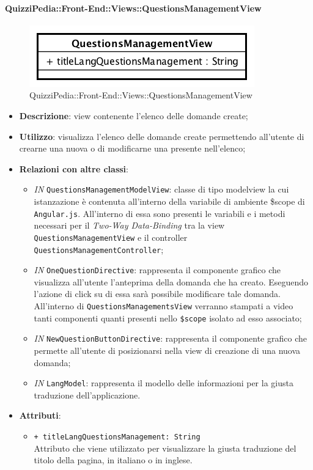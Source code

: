 \paragraph{QuizziPedia::Front-End::Views::QuestionsManagementView}
\begin{figure} [ht]
	\centering
	\includegraphics[scale=0.80]{UML/Classi/Front-End/QuizziPedia_Front-end_Views_QuestionsManagementView.png}
	\caption{QuizziPedia::Front-End::Views::QuestionsManagementView}
\end{figure} \FloatBarrier
\begin{itemize}
	\item \textbf{Descrizione}: view contenente l'elenco delle domande create; 
	\item \textbf{Utilizzo}: visualizza l'elenco delle domande create permettendo all'utente di crearne una nuova o di modificarne una presente nell'elenco;
	\item \textbf{Relazioni con altre classi}:
	\begin{itemize} 
		\item \textit{IN} \texttt{QuestionsManagementModelView}: classe di tipo modelview la cui istanzazione è contenuta all'interno della variabile di ambiente \$scope di \texttt{Angular.js}. All'interno di essa sono presenti le variabili e i metodi necessari per il \textit{Two-Way Data-Binding} tra la view \texttt{QuestionsManagementView} e il controller \texttt{QuestionsManagementController};
		\item \textit{IN} \texttt{OneQuestionDirective}: rappresenta il componente grafico che visualizza all'utente l'anteprima della domanda che ha creato. Eseguendo l'azione di click su di essa sarà possibile modificare tale domanda. All'interno di \texttt{QuestionsManagementsView} verranno stampati a video tanti componenti quanti presenti nello \texttt{\$scope} isolato ad esso associato;
		\item \textit{IN} \texttt{NewQuestionButtonDirective}:  rappresenta il componente grafico che permette all'utente di posizionarsi nella view di creazione di una nuova domanda;
		\item \textit{IN} \texttt{LangModel}: rappresenta il modello delle informazioni per la giusta traduzione dell'applicazione. 
	\end{itemize}
	\item \textbf{Attributi}:
	\begin{itemize}
		\item \texttt{+ titleLangQuestionsManagement: String} \\ Attributo che viene utilizzato per visualizzare la giusta traduzione del titolo della pagina, in italiano o in inglese.
	\end{itemize}
\end{itemize}
